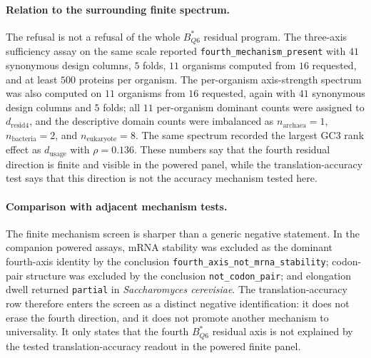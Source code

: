\paragraph{Relation to the surrounding finite spectrum.}
The refusal is not a refusal of the whole $B^{\ast}_{Q6}$ residual program.  The three-axis sufficiency assay on the same scale reported \texttt{fourth\_mechanism\_present} with $41$ synonymous design columns, $5$ folds, $11$ organisms computed from $16$ requested, and at least $500$ proteins per organism.  The per-organism axis-strength spectrum was also computed on $11$ organisms from $16$ requested, again with $41$ synonymous design columns and $5$ folds; all $11$ per-organism dominant counts were assigned to $d_{\mathrm{resid4}}$, and the descriptive domain counts were imbalanced as $n_{\mathrm{archaea}}=1$, $n_{\mathrm{bacteria}}=2$, and $n_{\mathrm{eukaryote}}=8$.  The same spectrum recorded the largest GC3 rank effect as $d_{\mathrm{usage}}$ with $\rho=0.136$.  These numbers say that the fourth residual direction is finite and visible in the powered panel, while the translation-accuracy test says that this direction is not the accuracy mechanism tested here.

\paragraph{Comparison with adjacent mechanism tests.}
The finite mechanism screen is sharper than a generic negative statement.  In the companion powered assays, mRNA stability was excluded as the dominant fourth-axis identity by the conclusion \texttt{fourth\_axis\_not\_mrna\_stability}; codon-pair structure was excluded by the conclusion \texttt{not\_codon\_pair}; and elongation dwell returned \texttt{partial} in \textit{Saccharomyces cerevisiae}.  The translation-accuracy row therefore enters the screen as a distinct negative identification: it does not erase the fourth direction, and it does not promote another mechanism to universality.  It only states that the fourth $B^{\ast}_{Q6}$ residual axis is not explained by the tested translation-accuracy readout in the powered finite panel.

